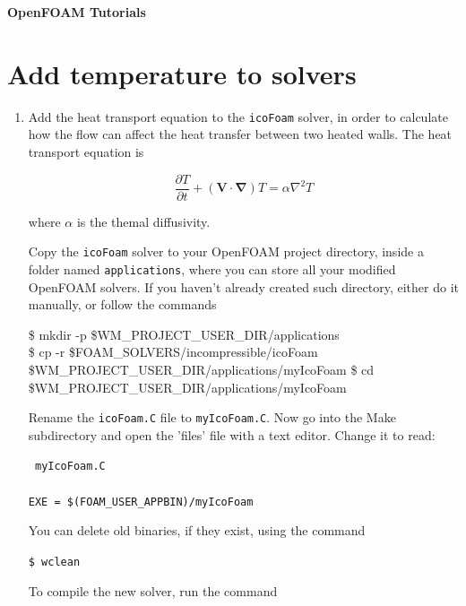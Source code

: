 \documentclass{article}
\newcommand\tab[1][0.5cm]{\hspace*{#1}}
\begin{document}
	

\noindent
\begin{huge}
\hspace{-3.0mm}\textbf{OpenFOAM Tutorials}
\end{huge}

\setcounter{section}{1}
\section{Add temperature to solvers}
	
\begin{enumerate}[2.1]
	\item Add  the heat transport equation to the {\tt icoFoam} solver, in order to calculate how the flow can affect the heat transfer between two heated walls. The heat transport equation is
	
	$$
	\dfrac{\partial T}{\partial t} + (\bm{V} \cdot \bm{\nabla}) T = \alpha \nabla^2 T
	$$

	where $\alpha$ is the themal diffusivity.
	
	Copy the {\tt icoFoam} solver to your OpenFOAM project directory, inside a folder named {\tt applications}, where you can store all your modified OpenFOAM solvers. If you haven't already created such directory, either do it manually, or follow the commands
	
	{\tt
		
	\tab	\$ mkdir -p \$WM\_PROJECT\_USER\_DIR/applications \\
	\tab 	\$ cp -r \$FOAM\_SOLVERS/incompressible/icoFoam \$WM\_PROJECT\_USER\_DIR/applications/myIcoFoam
	\tab 	\$ cd \$WM\_PROJECT\_USER\_DIR/applications/myIcoFoam
	}
	
	\vspace{0.2cm}
	
	Rename the {\tt icoFoam.C} file to {\tt myIcoFoam.C}. Now go into the Make subdirectory and open the 'files' file with a text editor. Change it to read: 


	\begin{myframe}
	{\tt %
	 myIcoFoam.C \\%
	 \\%
	 EXE = \$(FOAM\_USER\_APPBIN)/myIcoFoam}
 	\end{myframe}


	You can delete old binaries, if they exist, using the command
	
	{\tt \tab \$ wclean}
	
	To compile the new solver, run the command
	

\end{enumerate}
\end{document}
